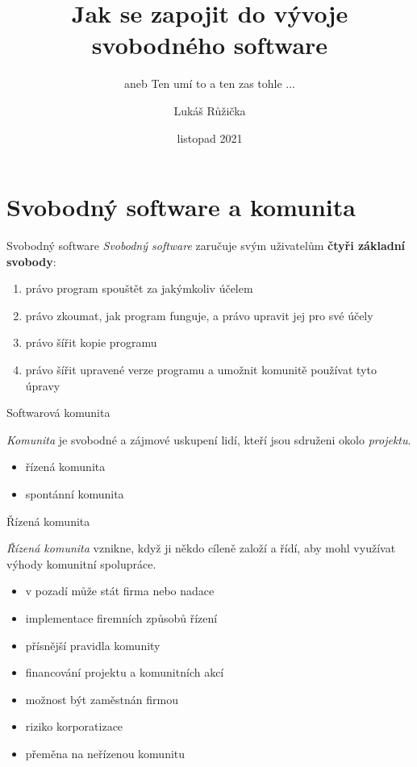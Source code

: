 \documentclass[11pt]{beamer}
\begin{document}
	\author{Lukáš Růžička}
	\title{Jak se zapojit do vývoje svobodného software}
	\subtitle{aneb Ten umí to a ten zas tohle ...}
	\date{listopad 2021}
	\begin{frame}[plain]
		\maketitle
	\end{frame}

\section{Svobodný software a komunita}

 	\begin{frame}{Svobodný software}
 		\textit{Svobodný software} zaručuje svým uživatelům \textbf{čtyři základní svobody}:
 		\begin{enumerate}
 			\item právo program spouštět za jakýmkoliv účelem
 			\item právo zkoumat, jak program funguje, a právo upravit jej pro své účely
 			\item právo šířit kopie programu
 			\item právo šířit upravené verze programu a umožnit komunitě používat tyto úpravy
 		\end{enumerate}
 	\end{frame}
 
 \begin{frame}{Softwarová komunita}
 	
 	\textit{Komunita} je svobodné a zájmové uskupení lidí, kteří jsou sdruženi okolo  \textit{projektu}.
 	
 	\begin{itemize}
 		\item řízená komunita
 		\item spontánní komunita
 	\end{itemize}

 \end{frame}

 \begin{frame}{Řízená komunita}
	
	\textit{Řízená komunita} vznikne, když ji někdo cíleně založí a řídí, aby mohl využívat výhody komunitní spolupráce.
	
	\begin{itemize}
		\item v pozadí může stát firma nebo nadace
		\item implementace firemních způsobů řízení
		\item přísnější pravidla komunity
		\item financování projektu a komunitních akcí
		\item možnost být zaměstnán firmou
		\item riziko korporatizace
		\item přeměna na neřízenou komunitu
	\end{itemize}
\end{frame}
\end{document}
